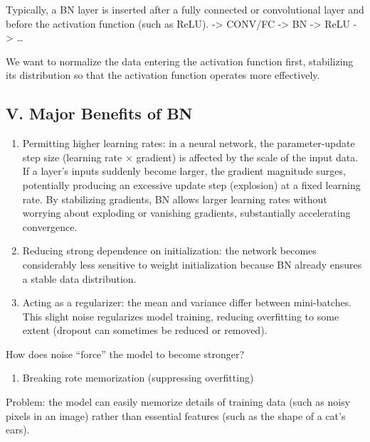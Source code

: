 Typically, a BN layer is inserted after a fully connected or convolutional layer and before the activation function (such as ReLU).
-\textgreater{} CONV/FC -\textgreater{} BN -\textgreater{} ReLU -\textgreater{} \ldots{}

We want to normalize the data entering the activation function first, stabilizing its distribution so that the activation function operates more effectively.

\hypertarget{v.-major-benefits-of-bn}{%
\subsection{V. Major Benefits of BN}\label{v.-major-benefits-of-bn}}

\begin{enumerate}
\def\labelenumi{\arabic{enumi}.}
\item
  Permitting higher learning rates: in a neural network, the parameter-update step size (learning rate × gradient) is affected by the scale of the input data. If a layer's inputs suddenly become larger, the gradient magnitude surges, potentially producing an excessive update step (explosion) at a fixed learning rate. By stabilizing gradients, BN allows larger learning rates without worrying about exploding or vanishing gradients, substantially accelerating convergence.
\item
  Reducing strong dependence on initialization: the network becomes considerably less sensitive to weight initialization because BN already ensures a stable data distribution.
\item
  Acting as a regularizer: the mean and variance differ between mini-batches. This slight noise regularizes model training, reducing overfitting to some extent (dropout can sometimes be reduced or removed).
\end{enumerate}

How does noise ``force'' the model to become stronger?

\begin{enumerate}
\def\labelenumi{(\arabic{enumi})}
\tightlist
\item
  Breaking rote memorization (suppressing overfitting)
\end{enumerate}

Problem: the model can easily memorize details of training data (such as noisy pixels in an image) rather than essential features (such as the shape of a cat's ears).

